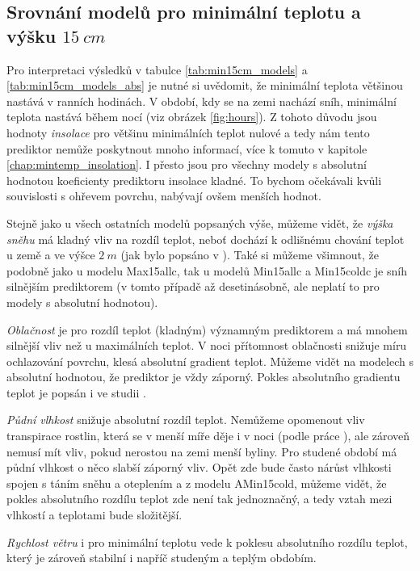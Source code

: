 \subsection{Srovnání modelů pro minimální teplotu a výšku $\SI{15}{cm}$}
Pro interpretaci výsledků v tabulce \ref{tab:min15cm_models} a \ref{tab:min15cm_models_abs} je nutné si uvědomit, že minimální teplota většinou nastává v ranních hodinách. V období, kdy se na zemi nachází sníh, minimální teplota nastává během nocí (viz obrázek \ref{fig:hours}). Z tohoto důvodu jsou hodnoty \textit{insolace} pro většinu minimálních teplot nulové a tedy nám tento prediktor nemůže poskytnout mnoho informací, více k tomuto v kapitole \ref{chap:mintemp_insolation}. I přesto jsou pro všechny modely s absolutní hodnotou koeficienty prediktoru insolace kladné. To bychom očekávali kvůli souvislosti s ohřevem povrchu, nabývají ovšem menších hodnot.

Stejně jako u všech ostatních modelů popsaných výše, můžeme vidět, že \textit{výška sněhu} má kladný vliv na rozdíl teplot, neboť dochází k odlišnému chování teplot u země a ve výšce $\SI{2}{m}$ (jak bylo popsáno v \cite{snow_deFrenneForestMicroclimates}). Také si můžeme všimnout, že podobně jako u modelu Max15allc, tak u modelů Min15allc a Min15coldc je sníh silnějším prediktorem (v tomto případě až desetinásobně, ale neplatí to pro modely s absolutní hodnotou). 

\textit{Oblačnost} je pro rozdíl teplot (kladným) významným prediktorem a má mnohem silnější vliv než u maximálních teplot. V noci přítomnost oblačnosti snižuje míru ochlazování povrchu, klesá absolutní gradient teplot. Můžeme vidět na modelech s absolutní hodnotou, že prediktor je vždy záporný. Pokles absolutního gradientu teplot je popsán i ve studii \cite{cloud_overwinteringclusters}. 

\textit{Půdní vlhkost} snižuje absolutní rozdíl teplot. Nemůžeme opomenout vliv transpirace rostlin, která se v menší míře děje i v noci (podle práce \cite{nighttranspiration}), ale zároveň nemusí mít vliv, pokud nerostou na zemi menší byliny. Pro studené období má půdní vlhkost o něco slabší záporný vliv. Opět zde bude často nárůst vlhkosti spojen s táním sněhu a oteplením a z modelu AMin15cold, můžeme vidět, že pokles absolutního rozdílu teplot zde není tak jednoznačný, a tedy vztah mezi vlhkostí a teplotami bude složitější.

\textit{Rychlost větru} i pro minimální teplotu vede k poklesu absolutního rozdílu teplot, který je zároveň stabilní i napříč studeným a teplým obdobím.

